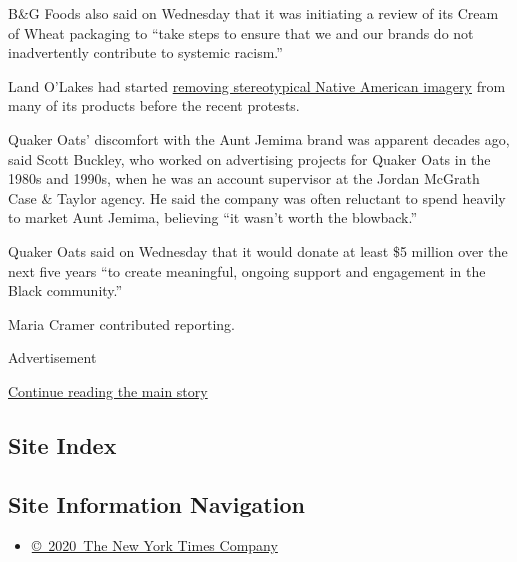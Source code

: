 B\&G Foods also said on Wednesday that it was initiating a review of its
Cream of Wheat packaging to ``take steps to ensure that we and our
brands do not inadvertently contribute to systemic racism.''

Land O'Lakes had started
\href{https://www.nytimes.com/2020/04/17/business/land-o-lakes-butter.html}{removing
stereotypical Native American imagery} from many of its products before
the recent protests.

Quaker Oats' discomfort with the Aunt Jemima brand was apparent decades
ago, said Scott Buckley, who worked on advertising projects for Quaker
Oats in the 1980s and 1990s, when he was an account supervisor at the
Jordan McGrath Case \& Taylor agency. He said the company was often
reluctant to spend heavily to market Aunt Jemima, believing ``it wasn't
worth the blowback.''

Quaker Oats said on Wednesday that it would donate at least \$5 million
over the next five years ``to create meaningful, ongoing support and
engagement in the Black community.''

Maria Cramer contributed reporting.

Advertisement

\protect\hyperlink{after-bottom}{Continue reading the main story}

\hypertarget{site-index}{%
\subsection{Site Index}\label{site-index}}

\hypertarget{site-information-navigation}{%
\subsection{Site Information
Navigation}\label{site-information-navigation}}

\begin{itemize}
\tightlist
\item
  \href{https://help.nytimes.com/hc/en-us/articles/115014792127-Copyright-notice}{©~2020~The
  New York Times Company}
\end{itemize}


